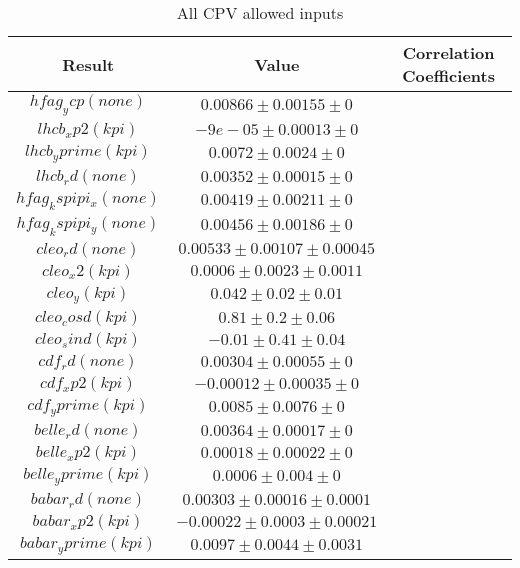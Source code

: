 \begin{table}[htdp]
\caption{All CPV allowed inputs}
\begin{center}
\begin{tabular}{|c|c|c|}
\hline
Result & Value & Correlation Coefficients \\
\hline \hline
$hfag_ycp(none)$ & $0.00866\pm0.00155\pm0$ & \\
$lhcb_xp2(kpi)$ & $-9e-05\pm0.00013\pm0$ & \\
$lhcb_yprime(kpi)$ & $0.0072\pm0.0024\pm0$ & \\
$lhcb_rd(none)$ & $0.00352\pm0.00015\pm0$ & \\
$hfag_kspipi_x(none)$ & $0.00419\pm0.00211\pm0$ & \\
$hfag_kspipi_y(none)$ & $0.00456\pm0.00186\pm0$ & \\
$cleo_rd(none)$ & $0.00533\pm0.00107\pm0.00045$ & \\
$cleo_x2(kpi)$ & $0.0006\pm0.0023\pm0.0011$ & \\
$cleo_y(kpi)$ & $0.042\pm0.02\pm0.01$ & \\
$cleo_cosd(kpi)$ & $0.81\pm0.2\pm0.06$ & \\
$cleo_sind(kpi)$ & $-0.01\pm0.41\pm0.04$ & \\
$cdf_rd(none)$ & $0.00304\pm0.00055\pm0$ & \\
$cdf_xp2(kpi)$ & $-0.00012\pm0.00035\pm0$ & \\
$cdf_yprime(kpi)$ & $0.0085\pm0.0076\pm0$ & \\
$belle_rd(none)$ & $0.00364\pm0.00017\pm0$ & \\
$belle_xp2(kpi)$ & $0.00018\pm0.00022\pm0$ & \\
$belle_yprime(kpi)$ & $0.0006\pm0.004\pm0$ & \\
$babar_rd(none)$ & $0.00303\pm0.00016\pm0.0001$ & \\
$babar_xp2(kpi)$ & $-0.00022\pm0.0003\pm0.00021$ & \\
$babar_yprime(kpi)$ & $0.0097\pm0.0044\pm0.0031$ & \\
\hline
\end{tabular}
\end{center}
\label{table:input/hfag_april_2013/nocpv_inputs}
\end{table}
